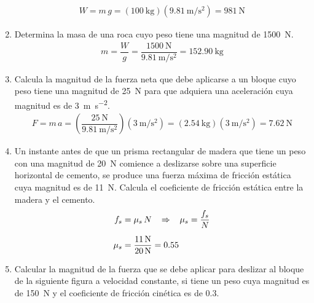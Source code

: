 \documentclass[14pt]{extarticle}
\begin{document}
\begin{enumerate}
\begin{align*}
W = m \, g = (\SI{100}{\kilo\gram})(\SI{9.81}{\meter\per\square\second}) = \SI{981}{\newton}
\end{align*}
\item Determina la masa de una roca cuyo peso tiene una magnitud de \SI{1500}{\newton}.
\begin{align*}
m = \dfrac{W}{g} = \dfrac{\SI{1500}{\newton}}{\SI{9.81}{\meter\per\square\second}} = \SI{152.90}{\kilo\gram}
\end{align*}
\item Calcula la magnitud de la fuerza neta que debe aplicarse a un bloque cuyo peso tiene una magnitud de \SI{25}{\newton} para que adquiera una aceleración cuya magnitud es de \SI{3}{\meter\per\square\second}.
\begin{align*}
F = m \, a = \left( \dfrac{\SI{25}{\newton}}{\SI{9.81}{\meter\per\square\second}} \right) (\SI{3}{\meter\per\square\second}) = (\SI{2.54}{\kilo\gram})(\SI{3}{\meter\per\square\second}) = \SI{7.62}{\newton}
\end{align*}
\item Un instante antes de que un prisma rectangular de madera que tiene un peso con una magnitud de \SI{20}{\newton} comience a deslizarse sobre una superficie horizontal de cemento, se produce una fuerza máxima de fricción estática cuya magnitud es de \SI{11}{\newton}. Calcula el coeficiente de fricción estática entre la madera y el cemento.
\begin{align*}
f_{s} &= \mu_{s} \, N \hspace{0.3cm} \Rightarrow \hspace{0.3cm} \mu_{s} = \dfrac{f_{s}}{N} \\[0.5em]
\mu_{s} &= \dfrac{\SI{11}{\newton}}{\SI{20}{\newton}} = \num{0.55}
\end{align*}
\item Calcular la magnitud de la fuerza que se debe aplicar para deslizar al bloque de la siguiente figura a velocidad constante, si tiene un peso cuya magnitud es de \SI{150}{N} y el coeficiente de fricción cinética es
de \num{0.3}.
\begin{figure}[H]
    \centering

\end{figure}
\end{enumerate}
\end{document}
